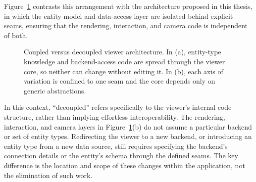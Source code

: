 Figure~\ref{fig:coupled-vs-decoupled} contrasts this arrangement with the architecture proposed in this thesis, in which the entity model and data-access layer are isolated behind explicit seams, ensuring that the rendering, interaction, and camera code is independent of both.

\begin{figure}[t]
  \centering
  \caption[Coupled versus decoupled viewer architecture]{Coupled versus decoupled viewer architecture. In (a), entity-type knowledge and backend-access code are spread through the viewer core, so neither can change without editing it. In (b), each axis of variation is confined to one seam and the core depends only on generic abstractions.}
  \label{fig:coupled-vs-decoupled}
\end{figure}

In this context, ``decoupled'' refers specifically to the viewer's internal code structure, rather than implying effortless interoperability. The rendering, interaction, and camera layers in Figure~\ref{fig:coupled-vs-decoupled}(b) do not assume a particular backend or set of entity types. Redirecting the viewer to a new backend, or introducing an entity type from a new data source, still requires specifying the backend's connection details or the entity's schema through the defined seams. The key difference is the location and scope of these changes within the application, not the elimination of such work.

